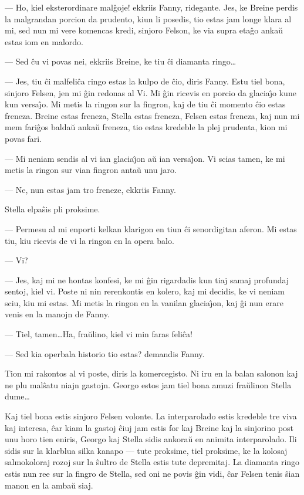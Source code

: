  --- Ho, kiel eksterordinare mal\^goje! ekkriis Fanny, ridegante. Jes,
ke Breine perdis la malgrandan porcion da prudento, kiun li posedis,
tio estas jam longe klara al mi, sed nun mi vere komencas kredi,
sinjoro Felson, ke via supra eta\^go anka\u u estas iom en malordo.

 --- Sed \^cu vi povas nei, ekkriis Breine, ke tiu \^ci diamanta
ringo\dots

 --- Jes, tiu \^ci malfeli\^ca ringo estas la kulpo de \^cio, diris Fanny.
Estu tiel bona, sinjoro Felsen, jen mi \^gin redonas al Vi. Mi \^gin
ricevis en porcio da glacia\^{\j}o kune kun versa\^{\j}o. Mi metis
la ringon sur la fingron, kaj de tiu \^ci momento \^cio estas
freneza. Breine estas freneza, Stella estas freneza, Felsen estas
freneza, kaj nun mi mem fari\^gos balda\u u anka\u u freneza, tio
estas kredeble la plej prudenta, kion mi povas fari.

 --- Mi neniam sendis al vi ian glacia\^{\j}on a\u u ian versa\^{\j}on. Vi scias
tamen, ke mi metis la ringon sur vian fingron anta\u u unu jaro.

 --- Ne, nun estas jam tro freneze, ekkriis Fanny.

   Stella elpa\^sis pli proksime.

 --- Permesu al mi enporti kelkan klarigon en tiun \^ci senordigitan
aferon. Mi estas tiu, kiu ricevis de vi la ringon en la opera balo.

 --- Vi?

 --- Jes, kaj mi ne hontas konfesi, ke mi \^gin rigardadis kun tiaj
samaj profundaj sentoj, kiel vi. Poste ni nin rerenkontis en kolero,
kaj mi decidis, ke vi neniam sciu, kiu mi estas. Mi metis la ringon
en la vanilan glacia\^{\j}on, kaj \^gi nun erare venis en la manojn
de Fanny.

 --- Tiel, tamen\dots Ha, fra\u ulino, kiel vi min faras feli\^ca!

 --- Sed kia operbala historio tio estas? demandis Fanny.

   Tion mi rakontos al vi poste, diris la komercegisto. Ni iru en la
balan salonon kaj ne plu mal\^satu niajn gastojn. Georgo estos jam
tiel bona amuzi fra\u ulinon Stella dume\dots

   Kaj tiel bona estis sinjoro Felsen volonte. La interparolado estis
kredeble tre viva kaj interesa, \^car kiam la gastoj \^ciuj jam
estis for kaj Breine kaj la sinjorino post unu horo tien eniris,
Georgo kaj Stella sidis ankora\u u en animita interparolado. Ili
sidis sur la klarblua silka kanapo --- tute proksime, tiel proksime,
ke la kolosaj salmokoloraj rozoj sur la \^sultro de Stella estis
tute depremitaj. La diamanta ringo estis nun ree sur la fingro de
Stella, sed oni ne povis \^gin vidi, \^car Felsen tenis \^sian manon
en la amba\u u siaj.

